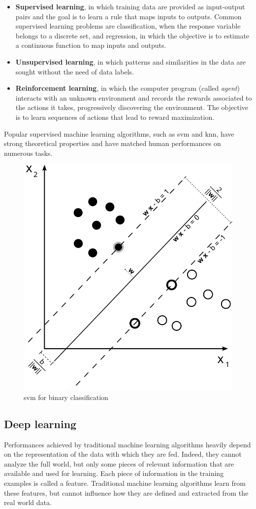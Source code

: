 \documentclass[%
    corpo=12pt,
    twoside,
    stile=classica,   
    tipotesi=magistrale,
    evenboxes,
    english,
	numerazioneromana,
]{toptesi}
\begin{document}
\begin{itemize}
	\item \textbf{Supervised learning}, in which training data are provided as input-output pairs and the goal is to learn a rule that maps inputs to outputs. Common supervised learning problems are classification, when the response variable belongs to a discrete set, and regression, in which the objective is to estimate a continuous function to map inputs and outputs.
	\item \textbf{Unsupervised learning}, in which patterns and similarities in the data are sought without the need of data labels.
	\item \textbf{Reinforcement learning}, in which the computer program (called \textit{agent}) interacts with an unknown environment and records the rewards associated to the actions it takes, progressively discovering the environment. The objective is to learn sequences of actions that lead to reward maximization.
\end{itemize}

Popular supervised machine learning algorithms, such as \gls{svm} and \gls{knn}, have strong theoretical properties and have matched human performances on numerous tasks.

\begin{figure}[ht]
	\centering
	\includegraphics[width=.45\linewidth]{imgs/svm.png}
	\caption{\Gls{svm} for binary classification}
	\label{fig:supervised}
\end{figure}

\subsection{Deep learning}
Performances achieved by traditional machine learning algorithms heavily depend on the representation of the data with which they are fed. Indeed, they cannot analyze the full world, but only some pieces of relevant information that are available and used for learning. Each piece of information in the training examples is called a feature. Traditional machine learning algorithms learn from these features, but cannot influence how they are defined and extracted from the real world data.
\end{document}

